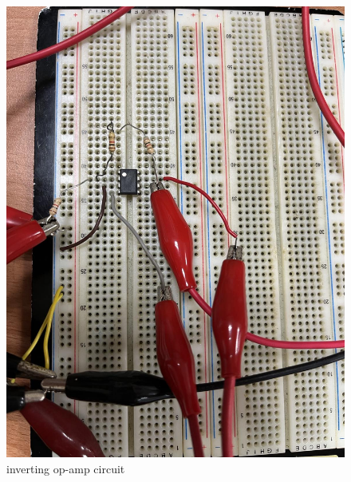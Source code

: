 \documentclass{article}
\begin{document}
\begin{CJK*}{UTF8}{bkai}
\begin{minipage}{0.50\textwidth}
\begin{figure}[H]
\begin{center}
            \includegraphics[scale=0.10]{inv_op_amp_circuit.jpg}
            \caption{inverting op-amp circuit}
        \end{center}
    \end{figure}    
\end{minipage}


\begin{center}
\begin{figure}[h]
    

\end{figure}
\end{center}
\end{CJK*}
\end{document}

